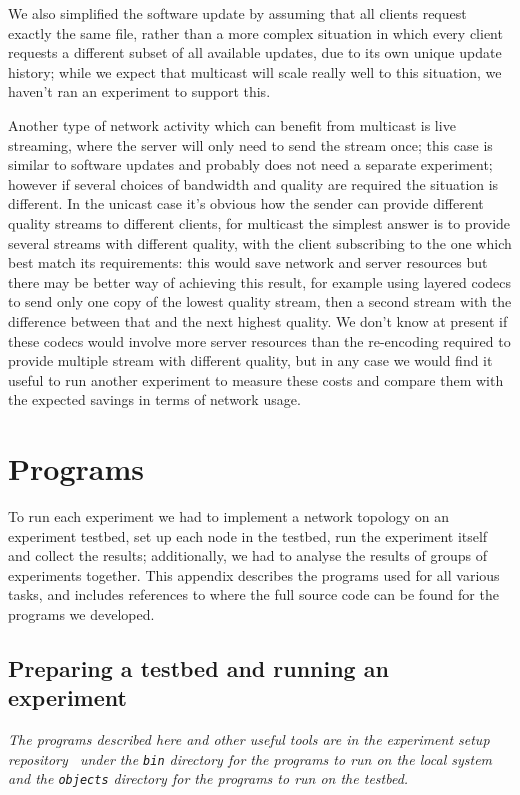 \documentclass[a4paper,12pt]{article}
\begin{document}
We also simplified the software update by assuming that all clients
request exactly the same file, rather than a more complex situation
in which every client requests a different subset of all available
updates, due to its own unique update history; while we expect that
multicast will scale really well to this situation, we haven't
ran an experiment to support this.

Another type of network activity which can benefit from multicast is
live streaming, where the server will only need to send the stream once;
this case is similar to software updates and probably does not need a
separate experiment; however if several choices of bandwidth and quality
are required the situation is different.  In the unicast case it's obvious
how the sender can provide different quality streams to different clients,
for multicast the simplest answer is to provide several streams with
different quality, with the client subscribing to the one which best
match its requirements: this would save network and server resources
but there may be better way of achieving this result, for example using
layered codecs to send only one copy of the lowest quality stream, then
a second stream with the difference between that and the next highest
quality. We don't know at present if these codecs would involve more
server resources than the re-encoding required to provide multiple
stream with different quality, but in any case we would find it useful
to run another experiment to measure these costs and compare them with
the expected savings in terms of network usage.

\appendix
\section{Programs}
\label{programs}

To run each experiment we had to implement a network topology on an
experiment testbed, set up each node in the testbed, run the experiment
itself and collect the results; additionally, we had to analyse the
results of groups of experiments together.  This appendix describes
the programs used for all various tasks, and includes references to
where the full source code can be found for the programs we developed.

\subsection{Preparing a testbed and running an experiment}

{\em The programs described here and other useful tools are in the experiment
setup repository~\cite{exp:scripts} under the {\tt bin} directory for
the programs to run on the local system and the {\tt objects} directory
for the programs to run on the testbed.}
\end{document}
